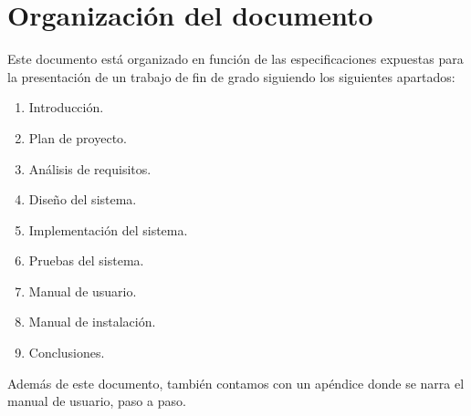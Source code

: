 \section{Organización del documento}
Este documento está organizado en función de las especificaciones expuestas para la presentación de un trabajo de fin de grado siguiendo los siguientes apartados:
\begin{enumerate}
	\item Introducción.
	\item Plan de proyecto.
	\item Análisis de requisitos.
	\item Diseño del sistema.
	\item Implementación del sistema.
	\item Pruebas del sistema.
	\item Manual de usuario.
	\item Manual de instalación.
	\item Conclusiones.
\end{enumerate}

Además de este documento, también contamos con un apéndice donde se narra el manual de usuario, paso a paso.
